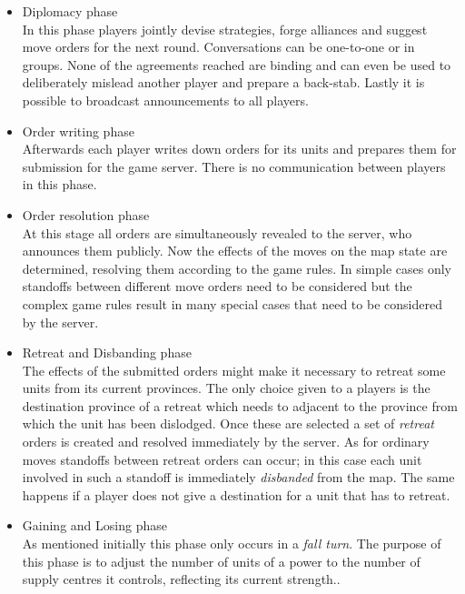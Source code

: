 \documentclass[pdftex,12pt,a4paper]{report}
\begin{document}
\begin{itemize}

\item Diplomacy phase \\
In this phase players jointly devise strategies, forge alliances and
suggest move orders for the next round. Conversations can be 
one-to-one or in groups. None of the agreements
reached are binding and can even be used to deliberately 
mislead another player and prepare a back-stab. Lastly it is possible
to broadcast announcements to all players.

\item Order writing phase \\
Afterwards each player writes down orders for its units and prepares
them for submission for the game server. There is no communication 
between players in this phase. 

\item Order resolution phase \\
At this stage all orders are simultaneously revealed to the server,
who announces them publicly. Now the effects of the moves on the
map state are determined, resolving them according to the game rules.
In simple cases only standoffs between different move orders need
to be considered but the complex game rules result in many special
cases that need to be considered by the server. 

\item Retreat and Disbanding phase \\
The effects of the submitted orders might make it necessary to retreat
some units from its current provinces. The only choice given to a
players is the destination province of a retreat which needs to
adjacent to the province from which the unit has been dislodged. Once
these are selected a set of \textit{retreat} orders is created and
resolved immediately by the server. As for ordinary moves standoffs
between retreat orders can occur; in this case each unit involved in
such a standoff is immediately \textit{disbanded} from the map. The
same happens if a player does not give a destination for a unit that
has to retreat.

\item Gaining and Losing phase \\
As mentioned initially this phase only occurs in a \textit{fall turn}.
The purpose of this phase is to adjust the number of units of a power
to the number of supply centres it controls, reflecting its current
strength.. 

\end{itemize}
\end{document}
